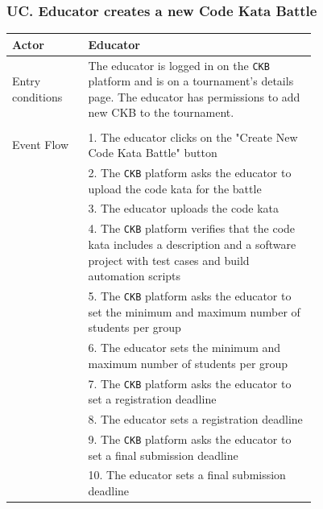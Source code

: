 

\subsubsection*{UC\cuc . Educator creates a new Code Kata Battle}
\begin{center}
    \begin{longtable}{lp{0.75\linewidth}}
        \hline
        Actor            & Educator \\
        \hline
        Entry conditions & The educator is logged in on the \verb|CKB| platform and is on a tournament's details page. The educator has permissions to add new CKB to the tournament.\\                                                                                                               \\
        \hline
        Event Flow      
        & 1. The educator clicks on the "Create New Code Kata Battle" button\\ 
        & 2. The \verb|CKB| platform asks the educator to upload the code kata for the battle\\
        & 3. The educator uploads the code kata\\
        & 4. The \verb|CKB| platform verifies that the code kata includes a description and a software project with test cases and build automation scripts\\
        & 5. The \verb|CKB| platform asks the educator to set the minimum and maximum number of students per group\\
        & 6. The educator sets the minimum and maximum number of students per group\\
        & 7. The \verb|CKB| platform asks the educator to set a registration deadline\\
        & 8. The educator sets a registration deadline\\
        & 9. The \verb|CKB| platform asks the educator to set a final submission deadline\\
        & 10. The educator sets a final submission deadline\\

\end{longtable}
\end{center}
